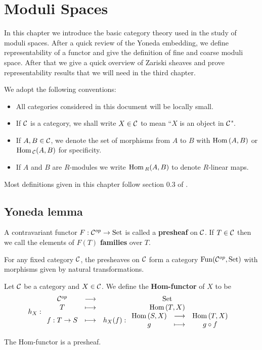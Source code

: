 \chapter{Moduli Spaces}

In this chapter we introduce the basic category theory used in the study of moduli spaces. After a quick review of the Yoneda embedding, we define representability of a functor and give the definition of fine and coarse moduli space. After that we give a quick overview of Zariski sheaves and prove representability results that we will need in the third chapter.\medskip

We adopt the following conventions:
\begin{itemize}
\item All categories considered in this document will be locally small.
\item If $\mathcal{C}$ is a category, we shall write $X\in \mathcal{C}$ to mean ``$X$ is an object in $\mathcal{C}$".
\item If $A,B\in \mathcal{C}$, we denote the set of morphisms from $A$ to $B$ with $\mathrm{Hom}\,(A,B)$ or $\mathrm{Hom}\,_{\mathcal{C}}(A,B)$ for specificity.
\item If $A$ and $B$ are $R$-modules we write $\mathrm{Hom}\,_R(A,B)$ to denote $R$-linear maps.
\end{itemize}
Most definitions given in this chapter follow section 0.3 of \cite{Alper}.


\section{Yoneda lemma}
\begin{definition}[Presheaf]
A contravariant functor $F:\mathcal{C}^{op}\to \mathrm{Set}$ is called a \textbf{presheaf} on $\mathcal{C}$. If $T\in \mathcal{C}$ then we call the elements of $F(T)$ \textbf{families} over $T$.
\end{definition}
\begin{definition}
For any fixed category $\mathcal{C}$, the presheaves on $\mathcal{C}$ form a category $\mathrm{Fun}(\mathcal{C}^{op},\mathrm{Set})$ with morphisms given by natural transformations.
\end{definition}

\begin{definition}
Let $\mathcal{C}$ be a category and $X\in \mathcal{C}$. We define the \textbf{Hom-functor} of $X$ to be
\[h_X:\begin{array}{ccc} {\mathcal{C}^{op}} & \longrightarrow & {\mathrm{Set}}\\ {T} & \longmapsto & {\mathrm{Hom}\,(T,X)}\\ {f:T\to S} & \longmapsto & {h_X(f):\begin{array}{ccc} {\mathrm{Hom}\,(S,X)} & \longrightarrow & {\mathrm{Hom}\,(T,X)}\\ {g} & \longmapsto & {g\circ f} \end{array}} \end{array}\]
\end{definition}
\begin{remark}
The Hom-functor is a presheaf.
\end{remark}

